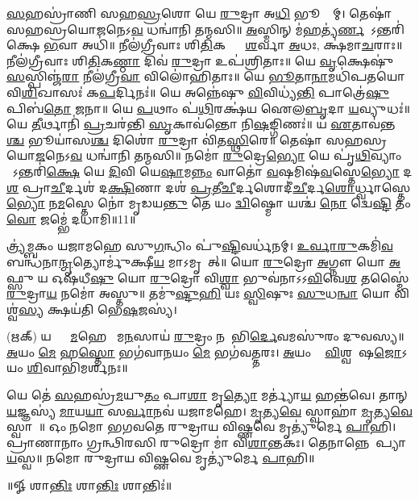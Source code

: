 \ul{𑌸}𑌹𑌸𑍍𑌰𑌾॑𑌣𑌿 𑌸𑌹\ul{𑌸𑍍𑌰}𑌶𑍋 𑌯𑍇 \ul{𑌰𑍁}𑌦𑍍𑌰𑌾 𑌅\ul{𑌧𑌿} 𑌭𑍂𑌮𑍍𑌯𑌾᳚𑌮𑍍। 𑌤𑍇𑌷𑌾॑ 𑌸𑌹𑌸𑍍𑌰𑌯𑍋\ul{𑌜}𑌨𑍇𑌽\ul{𑌵} 𑌧𑌨𑍍𑌵𑌾॑𑌨𑌿 𑌤𑌨𑍍𑌮𑌸𑌿॥ \ul{𑌅}𑌸𑍍𑌮𑌿𑌨𑍍 𑌮॑\ul{𑌹}𑌤𑍍𑌯॑\ul{𑌰𑍍𑌣}𑌵𑍇᳚\-𑌽𑌨𑍍𑌤𑌰𑌿॑𑌕𑍍𑌷𑍇 \ul{𑌭}𑌵𑌾 𑌅𑌧𑌿॑॥ 𑌨𑍀𑌲॑𑌗𑍍𑌰𑍀𑌵𑌾𑌃 𑌶𑌿\ul{𑌤𑌿}𑌕𑌣𑍍𑌠𑌾𑌃᳚ \ul{𑌶}𑌰𑍍𑌵𑌾 \ul{𑌅}𑌧𑌃, 𑌕𑍍𑌷॑𑌮𑌾\ul{𑌚}𑌰𑌾𑌃॥ 𑌨𑍀𑌲॑𑌗𑍍𑌰𑍀𑌵𑌾𑌃 𑌶𑌿\ul{𑌤𑌿}𑌕\ul{𑌣𑍍𑌠𑌾} 𑌦𑌿𑌵॑ \ul{𑌰𑍁}𑌦𑍍𑌰𑌾 𑌉𑌪॑𑌶𑍍𑌰𑌿𑌤𑌾𑌃॥ 𑌯𑍇 \ul{𑌵𑍃}𑌕𑍍𑌷𑍇𑌷𑍁॑ \ul{𑌸}𑌸𑍍𑌪𑌿𑌞𑍍𑌜॑\ul{𑌰𑌾} 𑌨𑍀𑌲॑𑌗𑍍𑌰𑍀\ul{𑌵𑌾} 𑌵𑌿𑌲𑍋॑𑌹𑌿𑌤𑌾𑌃॥ 𑌯𑍇 \ul{𑌭𑍂}𑌤𑌾\ul{𑌨𑌾}𑌮𑌧𑌿॑𑌪𑌤𑌯𑍋 𑌵𑌿\ul{𑌶𑌿}𑌖𑌾𑌸𑌃॑ 𑌕\ul{𑌪}𑌰𑍍𑌦𑌿𑌨𑌃॑॥ 𑌯𑍇 𑌅𑌨𑍍𑌨𑍇॑𑌷𑍁 \ul{𑌵𑌿}𑌵𑌿𑌧𑍍𑌯॑\ul{𑌨𑍍𑌤𑌿} 𑌪𑌾𑌤𑍍𑌰𑍇॑\ul{𑌷𑍁} 𑌪𑌿𑌬॑\ul{𑌤𑍋} 𑌜𑌨𑌾\sn ॥ 𑌯𑍇 \ul{𑌪}𑌥𑌾𑌂 𑌪॑\ul{𑌥𑌿}𑌰𑌕𑍍𑌷॑𑌯 𑌐𑌲\ul{𑌬𑍃}𑌦𑌾 \ul{𑌯}𑌵𑍍𑌯𑍁𑌧𑌃॑॥ 𑌯𑍇 \ul{𑌤𑍀}𑌰𑍍𑌥𑌾𑌨𑌿॑ \ul{𑌪𑍍𑌰}𑌚𑌰॑𑌨𑍍𑌤𑌿 \ul{𑌸𑍃}𑌕𑌾𑌵॑𑌨𑍍𑌤𑍋 𑌨𑌿\ul{𑌷}𑌙𑍍𑌗𑌿𑌣𑌃॑॥ 𑌯 \ul{𑌏}𑌤𑌾𑌵॑𑌨𑍍𑌤\ul{𑌶𑍍𑌚} 𑌭𑍂𑌯𑌾॑𑌸\ul{𑌶𑍍𑌚} 𑌦𑌿𑌶𑍋॑ \ul{𑌰𑍁}𑌦𑍍𑌰𑌾 𑌵𑌿॑𑌤\ul{𑌸𑍍𑌥𑌿}𑌰𑍇॥ 𑌤𑍇𑌷𑌾॑ 𑌸𑌹𑌸𑍍𑌰𑌯𑍋\ul{𑌜}𑌨𑍇𑌽\ul{𑌵} 𑌧𑌨𑍍𑌵𑌾॑𑌨𑌿 𑌤𑌨𑍍𑌮𑌸𑌿॥ 𑌨𑌮𑍋॑ \ul{𑌰𑍁}𑌦𑍍𑌰𑍇\ul{𑌭𑍍𑌯𑍋} 𑌯𑍇 𑌪𑍃॑\ul{𑌥𑌿}𑌵𑍍𑌯𑌾𑌂 𑌯𑍇᳚𑌽𑌨𑍍𑌤𑌰𑌿॑\ul{𑌕𑍍𑌷𑍇} 𑌯𑍇 \ul{𑌦𑌿}𑌵𑌿 𑌯𑍇\ul{𑌷𑌾}𑌮\ul{𑌨𑍍𑌨𑌂} 𑌵𑌾𑌤𑍋॑ \ul{𑌵}\ar 𑌷𑌮𑌿𑌷॑\ul{𑌵}𑌸𑍍𑌤𑍇\ul{𑌭𑍍𑌯𑍋} 𑌦\ul{𑌶} 𑌪𑍍𑌰𑌾\ul{𑌚𑍀}𑌰𑍍𑌦𑌶॑ 𑌦\ul{𑌕𑍍𑌷𑌿}𑌣𑌾 𑌦𑌶॑ \ul{𑌪𑍍𑌰}𑌤𑍀\ul{𑌚𑍀}𑌰𑍍𑌦𑌶𑍋\-𑌦𑍀॑\ul{𑌚𑍀}𑌰𑍍𑌦\ul{𑌶𑍋}𑌰𑍍𑌧𑍍𑌵𑌾𑌸𑍍𑌤𑍇\ul{𑌭𑍍𑌯𑍋} 𑌨\ul{𑌮}𑌸𑍍𑌤𑍇 𑌨𑍋॑ 𑌮𑍃𑌡𑌯\ul{𑌨𑍍𑌤𑍁} 𑌤𑍇 𑌯𑌂 \ul{𑌦𑍍𑌵𑌿}𑌷𑍍𑌮𑍋 𑌯𑌶𑍍𑌚॑ \ul{𑌨𑍋} 𑌦𑍍𑌵𑍇\ul{𑌷𑍍𑌟𑌿} 𑌤𑌂 \ul{𑌵𑍋} 𑌜𑌮𑍍𑌭𑍇॑ 𑌦𑌧𑌾𑌮𑌿॥11॥ 

\lbrack 𑌤𑍍𑌰𑍍𑌯॑𑌮𑍍𑌬𑌕𑌂 𑌯𑌜𑌾𑌮𑌹𑍇 𑌸𑍁\ul{𑌗}𑌨𑍍𑌧𑌿𑌂 𑌪𑍁॑\ul{𑌷𑍍𑌟𑌿}𑌵𑌰𑍍𑌧॑𑌨𑌮𑍍। \ul{𑌉}\ul{𑌰𑍍𑌵𑌾}\ul{𑌰𑍁}𑌕𑌮𑌿॑\ul{𑌵} 𑌬𑌨𑍍𑌧॑𑌨𑌾\ul{𑌨𑍍𑌮𑍃}𑌤𑍍𑌯𑍋𑌰𑍍𑌮𑍁॑𑌕𑍍𑌷𑍀\ul{𑌯} 𑌮𑌾𑌽𑌮𑍃𑌤𑌾᳚𑌤𑍍॥ 𑌯𑍋 \ul{𑌰𑍁}𑌦𑍍𑌰𑍋 \ul{𑌅}𑌗𑍍𑌨𑍗 𑌯𑍋 \ul{𑌅}𑌫𑍍𑌸𑍁 𑌯 𑌓𑌷॑𑌧𑍀\ul{𑌷𑍁} 𑌯𑍋 \ul{𑌰𑍁}𑌦𑍍𑌰𑍋 𑌵𑌿\ul{𑌶𑍍𑌵𑌾} 𑌭𑍁𑌵॑𑌨𑌾𑌽𑌽\ul{𑌵𑌿}𑌵𑍇\ul{𑌶} 𑌤𑌸𑍍𑌮𑍈॑ \ul{𑌰𑍁}𑌦𑍍𑌰𑌾\ul{𑌯} 𑌨𑌮𑍋॑ 𑌅𑌸𑍍𑌤𑍁॥ 𑌤𑌮𑍁॑\ul{𑌷𑍍𑌟𑍁}\ul{𑌹𑌿} 𑌯𑌃 \ul{𑌸𑍍𑌵𑌿}𑌷𑍁𑌃 \ul{𑌸𑍁}𑌧\ul{𑌨𑍍𑌵𑌾} 𑌯𑍋 𑌵𑌿𑌶𑍍𑌵॑\ul{𑌸𑍍𑌯} 𑌕𑍍𑌷𑌯॑𑌤𑌿 𑌭𑍇\ul{𑌷}𑌜𑌸𑍍𑌯॑। 

(𑌋𑌕𑍍)   𑌯𑌕𑍍𑌷𑍍𑌵𑌾᳚\ul{𑌮}𑌹𑍇 𑌸𑍗᳚𑌮\ul{𑌨}𑌸𑌾𑌯॑ \ul{𑌰𑍁}𑌦𑍍𑌰𑌂 𑌨𑌮𑍋᳚𑌭𑌿\ul{𑌰𑍍𑌦𑍇}𑌵𑌮𑌸𑍁॑𑌰𑌂 𑌦𑍁𑌵𑌸𑍍𑌯॥ \ul{𑌅}𑌯𑌂 \ul{𑌮𑍇} 𑌹\ul{𑌸𑍍𑌤𑍋} 𑌭𑌗॑𑌵𑌾\ul{𑌨}𑌯𑌂 \ul{𑌮𑍇} 𑌭𑌗॑𑌵𑌤𑍍𑌤𑌰𑌃। \ul{𑌅}𑌯𑌂 𑌮𑍇᳚ \ul{𑌵𑌿}𑌶𑍍𑌵𑌭𑍇᳚𑌷\ul{𑌜𑍋}𑌽𑌯𑌂 \ul{𑌶𑌿}𑌵𑌾𑌭𑌿॑𑌮𑌰𑍍𑌶𑌨𑌃॥

𑌯𑍇 𑌤𑍇॑ \ul{𑌸}𑌹𑌸𑍍𑌰॑\ul{𑌮}𑌯𑍁\ul{𑌤𑌂} 𑌪𑌾\ul{𑌶𑌾} 𑌮𑍃\ul{𑌤𑍍𑌯𑍋} 𑌮𑌰𑍍𑌤𑍍𑌯𑌾॑\ul{𑌯} 𑌹𑌨𑍍𑌤॑𑌵𑍇। 𑌤𑌾𑌨𑍍 \ul{𑌯}𑌜𑍍𑌞𑌸𑍍𑌯॑ \ul{𑌮𑌾}𑌯\ul{𑌯𑌾} 𑌸\ul{𑌰𑍍𑌵𑌾}𑌨𑌵॑ 𑌯𑌜𑌾𑌮𑌹𑍇। \ul{𑌮𑍃}𑌤𑍍𑌯\ul{𑌵𑍇} 𑌸𑍍𑌵𑌾𑌹𑌾॑ \ul{𑌮𑍃}𑌤𑍍𑌯\ul{𑌵𑍇} 𑌸𑍍𑌵𑌾𑌹𑌾᳚॥ 𑌓𑌂 𑌨𑌮𑍋 𑌭𑌗𑌵𑌤𑍇 𑌰𑍁𑌦𑍍𑌰𑌾𑌯 𑌵𑌿𑌷𑍍𑌣𑌵𑍇 𑌮𑍃𑌤𑍍𑌯𑍁॑𑌰𑍍𑌮𑍇 \ul{𑌪𑌾}𑌹𑌿। 𑌪𑍍𑌰𑌾𑌣𑌾𑌨𑌾𑌂 𑌗𑍍𑌰𑌨𑍍𑌥𑌿𑌰𑌸𑌿 𑌰𑍁𑌦𑍍𑌰𑍋 𑌮𑌾॑ 𑌵𑌿\ul{𑌶𑌾}𑌨𑍍𑌤𑌕𑌃। 𑌤𑍇𑌨𑌾𑌨𑍍𑌨𑍇𑌨𑌾᳚𑌪𑍍𑌯𑌾\ul{𑌯}𑌸𑍍𑌵॥ 𑌨𑌮𑍋 𑌰𑍁𑌦𑍍𑌰𑌾𑌯 𑌵𑌿𑌷𑍍𑌣𑌵𑍇 𑌮𑍃𑌤𑍍𑌯𑍁॑𑌰𑍍𑌮𑍇 \ul{𑌪𑌾}𑌹𑌿॥\rbrack
 
\centerline{॥𑍐 𑌶𑌾\ul{𑌨𑍍𑌤𑌿𑌃} 𑌶𑌾\ul{𑌨𑍍𑌤𑌿𑌃} 𑌶𑌾𑌨𑍍𑌤𑌿𑌃॑॥}

{\small \closesection}

\newcommand{\cham}[3]{\refstepcounter{cj}%
#1\\
𑌅𑌨𑍇𑌨 #2-𑌵𑌾𑌰-𑌜𑌪𑍇𑌨 𑌭𑌗𑌵𑌾𑌨𑍍 𑌸𑌰𑍍𑌵𑌾𑌤𑍍𑌮𑌕𑌃 \underline{#3} 𑌸𑍁𑌪𑍍𑌰𑍀𑌤𑌃 𑌸𑍁𑌪𑍍𑌰𑌸𑌨𑍍𑌨𑍋 𑌵𑌰𑌦𑍋 𑌭𑌵𑌤𑍁॥\devanumber{\arabic{cj}}॥}

